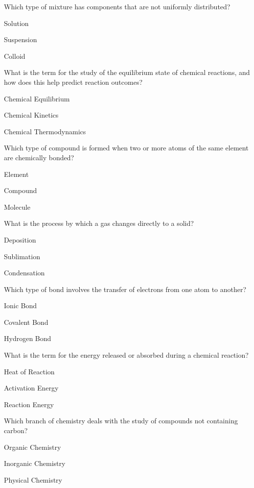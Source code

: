 \begin{enhancedmcq}{Which type of mixture has components that are not uniformly distributed?}
\item Solution
\item Suspension
\item Colloid

\end{enhancedmcq}
\begin{enhancedmcq}{What is the term for the study of the equilibrium state of chemical reactions, and how does this help predict reaction outcomes?}
\item Chemical Equilibrium
\item Chemical Kinetics
\item Chemical Thermodynamics

\end{enhancedmcq}
\begin{enhancedmcq}{Which type of compound is formed when two or more atoms of the same element are chemically bonded?}
\item Element
\item Compound
\item Molecule

\end{enhancedmcq}
\begin{enhancedmcq}{What is the process by which a gas changes directly to a solid?}
\item Deposition
\item Sublimation
\item Condensation

\end{enhancedmcq}
\begin{enhancedmcq}{Which type of bond involves the transfer of electrons from one atom to another?}
\item Ionic Bond
\item Covalent Bond
\item Hydrogen Bond

\end{enhancedmcq}
\begin{enhancedmcq}{What is the term for the energy released or absorbed during a chemical reaction?}
\item Heat of Reaction
\item Activation Energy
\item Reaction Energy

\end{enhancedmcq}
\begin{enhancedmcq}{Which branch of chemistry deals with the study of compounds not containing carbon?}
\item Organic Chemistry
\item Inorganic Chemistry
\item Physical Chemistry

\end{enhancedmcq}
